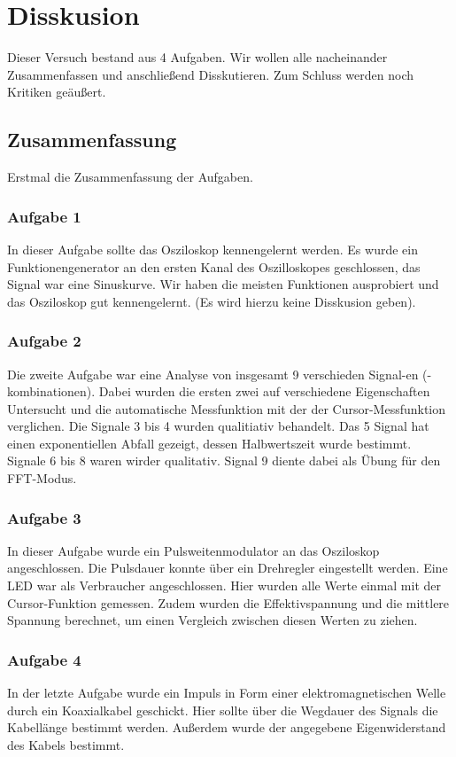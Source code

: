 \chapter{Disskusion}
Dieser Versuch bestand aus 4 Aufgaben. Wir wollen alle nacheinander Zusammenfassen und anschließend Disskutieren. Zum Schluss werden noch Kritiken geäußert.
\section{Zusammenfassung}
Erstmal die Zusammenfassung der Aufgaben.
\subsection*{Aufgabe 1}
In dieser Aufgabe sollte das Osziloskop kennengelernt werden. Es wurde ein Funktionengenerator an den ersten Kanal des Oszilloskopes geschlossen, das Signal war eine Sinuskurve. Wir haben die meisten Funktionen ausprobiert und das Osziloskop gut kennengelernt. (Es wird hierzu keine Disskusion geben).

\subsection*{Aufgabe 2}
Die zweite Aufgabe war eine Analyse von insgesamt 9 verschieden Signal-en (-kombinationen). Dabei wurden die ersten zwei auf verschiedene Eigenschaften Untersucht und die automatische Messfunktion mit der der Cursor-Messfunktion verglichen.
Die Signale 3 bis 4 wurden qualitiativ behandelt. Das 5 Signal hat einen exponentiellen Abfall gezeigt, dessen Halbwertszeit wurde bestimmt. 
Signale 6 bis 8 waren wirder qualitativ. Signal 9 diente dabei als Übung für den FFT-Modus.

\subsection*{Aufgabe 3}
In dieser Aufgabe wurde ein Pulsweitenmodulator an das Osziloskop angeschlossen. Die Pulsdauer konnte über ein Drehregler eingestellt werden. Eine LED war als Verbraucher angeschlossen.
Hier wurden alle Werte einmal mit der Cursor-Funktion gemessen. Zudem wurden die Effektivspannung und die mittlere Spannung berechnet, um einen Vergleich zwischen diesen Werten zu ziehen.

\subsection*{Aufgabe 4}
In der letzte Aufgabe wurde ein Impuls in Form einer elektromagnetischen Welle durch ein Koaxialkabel geschickt. Hier sollte über die Wegdauer des Signals die Kabellänge bestimmt werden. 
Außerdem wurde der angegebene Eigenwiderstand des Kabels bestimmt.

